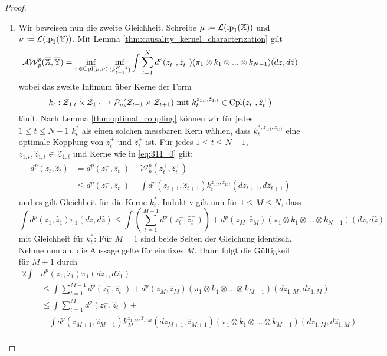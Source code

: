 \begin{proof}
\begin{enumerate}
\item
Wir beweisen nun die zweite Gleichheit. Schreibe $\mu := \mathcal{L}(\operatorname{ip}_1(\mathbb{X}))$ und $\nu := \mathcal{L}(\operatorname{ip}_1(\mathbb{Y}))$. Mit Lemma \ref{thm:causality_kernel_characterization} gilt
$$\mathcal{AW}_p^p(\overline{\mathbb{X}}, \overline{\mathbb{Y}}) = \inf_{\pi \in \operatorname{Cpl}(\mu, \nu)} \inf_{(k_{t=1}^{N-1})} \int \sum_{t=1}^{N}d^p(z_t^-, \hat{z}_t^-) (\pi_1 \otimes k_1 \otimes ... \otimes k_{N-1})(dz, d\hat{z})$$
wobei das zweite Infimum über Kerne der Form
\begin{equation}\label{eq:311_0}
k_t: \mathcal{Z}_{1:t}\times \mathcal{Z}_{1:t} \rightarrow \mathcal{P}_p(\mathcal{Z}_{t+1}\times \mathcal{Z}_{t+1}) \text{ mit } k_t^{z_{1:t}, \hat{z}_{1:t}} \in \operatorname{Cpl}(z_t^+, \hat{z}_t^+)
\end{equation}
läuft. Nach Lemma \ref{thm:optimal_coupling} können wir für jedes $1 \leq t \leq N-1$ $k_t^*$ als einen solchen messbaren Kern wählen, dass $k_t^{*, z_{1:t}, \hat{z}_{1:t}}$ eine optimale Kopplung von $z_t^+$ und $\hat{z}_t^+$ ist. Für jedes $1\leq t\leq N-1$, $z_{1:t}, \hat{z}_{1:t} \in \mathcal{Z}_{1:t}$ und Kerne wie in \ref{eq:311_0} gilt:
\begin{align}\label{eq:311_1}
    \begin{split}
    d^p(z_t, \hat{z}_t) &= d^p(z_t^-, \hat{z}_t^-) + \mathcal{W}_p^p(z_t^+, \hat{z}_t^+) \\
    &\leq d^p(z_t^-, \hat{z}_t^-) + \int d^p(z_{t+1}, \hat{z}_{t+1}) k_t^{z_{1:t}, \hat{z}_{1:t}}(dz_{t+1}, d\hat{z}_{t+1})
    \end{split}
\end{align}
und es gilt Gleichheit für die Kerne $k_t^*$. Induktiv gilt nun für $1 \leq M \leq N$, dass
$$\int d^p(z_1, \hat{z}_1)\pi_1(dz, d\hat{z}) \leq \int \left(\sum_{t=1}^{M-1} d^p(z_t^-, \hat{z}_t^-)\right) +d^p(z_M, \hat{z}_M)(\pi_1 \otimes k_1 \otimes ... \otimes k_{N-1})(dz, d\hat{z})$$
mit Gleichheit für $k_t^*$: Für $M=1$ sind beide Seiten der Gleichung identisch. Nehme nun an, die Aussage gelte für ein fixes $M$. Dann folgt die Gültigkeit für $M+1$ durch
\begin{alignat*}{2}
\int &d^p(z_1, \hat{z}_1)\pi_1(dz_1, d\hat{z}_1) \\
&\leq \int \sum_{t=1}^{M-1} d^p(z_t^-, \hat{z}_t^-) +d^p(z_M, \hat{z}_M)(\pi_1 \otimes k_1 \otimes ... \otimes k_{M-1})(dz_{1:M}, d\hat{z}_{1:M}) \\
&\leq\int \sum_{t=1}^{M}d^p(z_t^-, \hat{z}_t^-) + \\
    &\quad\int d^p(z_{M+1}, \hat{z}_{M+1}) k_M^{z_{1:M}, \hat{z}_{1:M}}(dz_{M+1}, \hat{z}_{M+1}) (\pi_1 \otimes k_1 \otimes ... \otimes k_{M-1})(dz_{1:M}, d\hat{z}_{1:M})\\

\end{alignat*}
\end{enumerate}
\end{proof}
